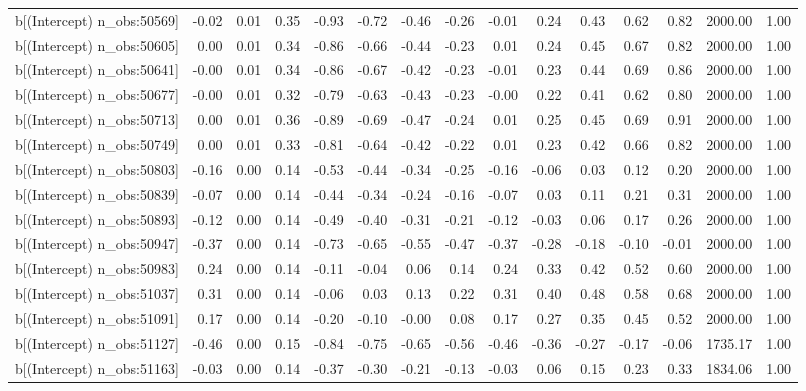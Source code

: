 \begin{table}[ht]
\begin{tabular}{rrrrrrrrrrrrrrr}
  b[(Intercept) n\_obs:50569] & -0.02 & 0.01 & 0.35 & -0.93 & -0.72 & -0.46 & -0.26 & -0.01 & 0.24 & 0.43 & 0.62 & 0.82 & 2000.00 & 1.00 \\ 
  b[(Intercept) n\_obs:50605] & 0.00 & 0.01 & 0.34 & -0.86 & -0.66 & -0.44 & -0.23 & 0.01 & 0.24 & 0.45 & 0.67 & 0.82 & 2000.00 & 1.00 \\ 
  b[(Intercept) n\_obs:50641] & -0.00 & 0.01 & 0.34 & -0.86 & -0.67 & -0.42 & -0.23 & -0.01 & 0.23 & 0.44 & 0.69 & 0.86 & 2000.00 & 1.00 \\ 
  b[(Intercept) n\_obs:50677] & -0.00 & 0.01 & 0.32 & -0.79 & -0.63 & -0.43 & -0.23 & -0.00 & 0.22 & 0.41 & 0.62 & 0.80 & 2000.00 & 1.00 \\ 
  b[(Intercept) n\_obs:50713] & 0.00 & 0.01 & 0.36 & -0.89 & -0.69 & -0.47 & -0.24 & 0.01 & 0.25 & 0.45 & 0.69 & 0.91 & 2000.00 & 1.00 \\ 
  b[(Intercept) n\_obs:50749] & 0.00 & 0.01 & 0.33 & -0.81 & -0.64 & -0.42 & -0.22 & 0.01 & 0.23 & 0.42 & 0.66 & 0.82 & 2000.00 & 1.00 \\ 
  b[(Intercept) n\_obs:50803] & -0.16 & 0.00 & 0.14 & -0.53 & -0.44 & -0.34 & -0.25 & -0.16 & -0.06 & 0.03 & 0.12 & 0.20 & 2000.00 & 1.00 \\ 
  b[(Intercept) n\_obs:50839] & -0.07 & 0.00 & 0.14 & -0.44 & -0.34 & -0.24 & -0.16 & -0.07 & 0.03 & 0.11 & 0.21 & 0.31 & 2000.00 & 1.00 \\ 
  b[(Intercept) n\_obs:50893] & -0.12 & 0.00 & 0.14 & -0.49 & -0.40 & -0.31 & -0.21 & -0.12 & -0.03 & 0.06 & 0.17 & 0.26 & 2000.00 & 1.00 \\ 
  b[(Intercept) n\_obs:50947] & -0.37 & 0.00 & 0.14 & -0.73 & -0.65 & -0.55 & -0.47 & -0.37 & -0.28 & -0.18 & -0.10 & -0.01 & 2000.00 & 1.00 \\ 
  b[(Intercept) n\_obs:50983] & 0.24 & 0.00 & 0.14 & -0.11 & -0.04 & 0.06 & 0.14 & 0.24 & 0.33 & 0.42 & 0.52 & 0.60 & 2000.00 & 1.00 \\ 
  b[(Intercept) n\_obs:51037] & 0.31 & 0.00 & 0.14 & -0.06 & 0.03 & 0.13 & 0.22 & 0.31 & 0.40 & 0.48 & 0.58 & 0.68 & 2000.00 & 1.00 \\ 
  b[(Intercept) n\_obs:51091] & 0.17 & 0.00 & 0.14 & -0.20 & -0.10 & -0.00 & 0.08 & 0.17 & 0.27 & 0.35 & 0.45 & 0.52 & 2000.00 & 1.00 \\ 
  b[(Intercept) n\_obs:51127] & -0.46 & 0.00 & 0.15 & -0.84 & -0.75 & -0.65 & -0.56 & -0.46 & -0.36 & -0.27 & -0.17 & -0.06 & 1735.17 & 1.00 \\ 
  b[(Intercept) n\_obs:51163] & -0.03 & 0.00 & 0.14 & -0.37 & -0.30 & -0.21 & -0.13 & -0.03 & 0.06 & 0.15 & 0.23 & 0.33 & 1834.06 & 1.00 \\ 

\end{tabular}
\end{table}

